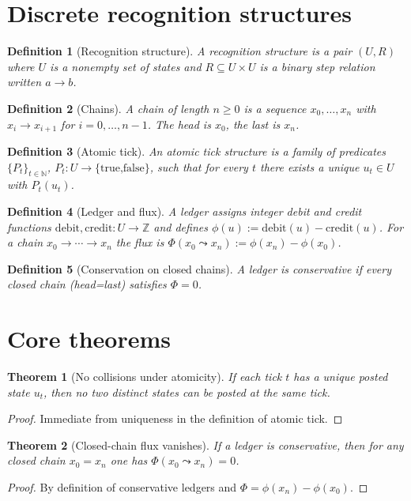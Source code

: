 \documentclass[11pt,letterpaper]{article}
\newtheorem{definition}{Definition}
\newtheorem{theorem}{Theorem}
\begin{document}
\section{Discrete recognition structures}
\begin{definition}[Recognition structure]
A recognition structure is a pair $(U, R)$ where $U$ is a nonempty set of states and $R\subseteq U\times U$ is a binary step relation written $a\to b$.
\end{definition}
\begin{definition}[Chains]
A chain of length $n\ge0$ is a sequence $x_0,\dots,x_n$ with $x_i\to x_{i+1}$ for $i{=}0,\dots,n{-}1$. The head is $x_0$, the last is $x_n$.
\end{definition}
\begin{definition}[Atomic tick]
An atomic tick structure is a family of predicates $\{P_t\}_{t\in\mathbb N}$, $P_t:U\to\{\text{true,false}\}$, such that for every $t$ there exists a unique $u_t\in U$ with $P_t(u_t)$.\end{definition}
\begin{definition}[Ledger and flux]
A ledger assigns integer debit and credit functions $\mathrm{debit},\mathrm{credit}:U\to\mathbb Z$ and defines $\phi(u):=\mathrm{debit}(u)-\mathrm{credit}(u)$. For a chain $x_0\to\cdots\to x_n$ the flux is $\Phi(x_0\leadsto x_n):=\phi(x_n)-\phi(x_0)$.
\end{definition}
\begin{definition}[Conservation on closed chains]
A ledger is conservative if every closed chain (head=last) satisfies $\Phi=0$.
\end{definition}

\section{Core theorems}
\begin{theorem}[No collisions under atomicity]\label{thm:atomic}
If each tick $t$ has a unique posted state $u_t$, then no two distinct states can be posted at the same tick.
\end{theorem}
\begin{proof}
Immediate from uniqueness in the definition of atomic tick.
\end{proof}

\begin{theorem}[Closed-chain flux vanishes]\label{thm:closed}
If a ledger is conservative, then for any closed chain $x_0{=}x_n$ one has $\Phi(x_0\leadsto x_n)=0$.
\end{theorem}
\begin{proof}
By definition of conservative ledgers and $\Phi=\phi(x_n)-\phi(x_0)$.
\end{proof}
\end{document}
